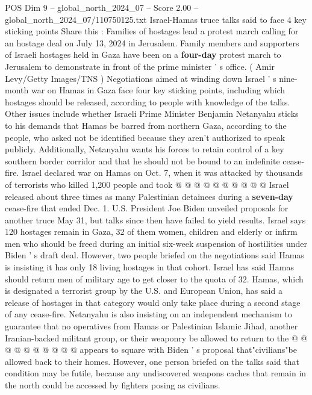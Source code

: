 \begin{textsample}{POS Dim 9 – global\_north\_2024\_07 – Score 2.00 – global\_north\_2024\_07/110750125.txt}  \label{ex:f9_pos_311}
Israel-Hamas truce talks said to face 4 key sticking points Share this : Families of hostages lead a protest march calling for an hostage deal on July 13, 2024 in Jerusalem.
Family members and supporters of Israeli hostages held in Gaza have been on a \textbf{four-day} protest march to Jerusalem to demonstrate in front of the prime minister ' s office. ( Amir Levy/Getty Images/TNS ) Negotiations aimed at winding down Israel ' s nine-month war on Hamas in Gaza face four key sticking points, including which hostages should be released, according to people with knowledge of the talks.
Other issues include whether Israeli Prime Minister Benjamin Netanyahu sticks to his demands that Hamas be barred from northern Gaza, according to the people, who asked not be identified because they aren't authorized to speak publicly.
Additionally, Netanyahu wants his forces to retain control of a key southern border corridor and that he should not be bound to an indefinite cease-fire.
Israel declared war on Hamas on Oct. 7, when it was attacked by thousands of terrorists who killed 1,200 people and took @ @ @ @ @ @ @ @ @ @ Israel released about three times as many Palestinian detainees during a \textbf{seven-day} cease-fire that ended Dec. 1.
U.S.
President Joe Biden unveiled proposals for another truce May 31, but talks since then have failed to yield results.
Israel says 120 hostages remain in Gaza, 32 of them women, children and elderly or infirm men who should be freed during an initial six-week suspension of hostilities under Biden ' s draft deal.
However, two people briefed on the negotiations said Hamas is insisting it has only 18 living hostages in that cohort.
Israel has said Hamas should return men of military age to get closer to the quota of 32.
Hamas, which is designated a terrorist group by the U.S. and European Union, has said a release of hostages in that category would only take place during a second stage of any cease-fire.
Netanyahu is also insisting on an independent mechanism to guarantee that no operatives from Hamas or Palestinian Islamic Jihad, another Iranian-backed militant group, or their weaponry be allowed to return to the @ @ @ @ @ @ @ @ @ @ appears to square with Biden ' s proposal that"civilians"be allowed back to their homes.
However, one person briefed on the talks said that condition may be futile, because any undiscovered weapons caches that remain in the north could be accessed by fighters posing as civilians.

\end{textsample}
